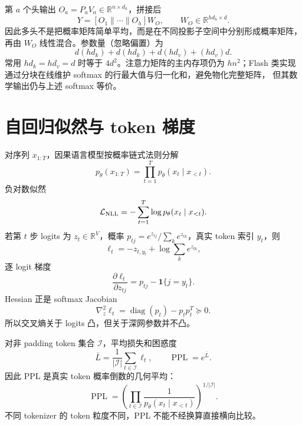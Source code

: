\documentclass[11pt]{article}
\numberwithin{equation}{section}
\newcommand{\R}{\mathbb{R}}
\newcommand{\1}{\mathbf{1}}
\newcommand{\cL}{\mathcal{L}}
\newcommand{\diag}{\operatorname{diag}}
\begin{document}
第 $a$ 个头输出 $O_a=P_aV_a\in\R^{n\times d_h}$，拼接后
\begin{equation}
 Y=[O_1\|\cdots\|O_h]W_O,
 \qquad W_O\in\R^{hd_h\times d}.
\end{equation}
因此多头不是把概率矩阵简单平均，而是在不同投影子空间中分别形成概率矩阵，
再由 $W_O$ 线性混合。参数量（忽略偏置）为
\begin{equation}
 d(hd_k)+d(hd_k)+d(hd_v)+(hd_v)d.
\end{equation}
常用 $hd_k=hd_v=d$ 时等于 $4d^2$。注意力矩阵的主内存项仍为
$h n^2$；Flash 类实现通过分块在线维护 softmax 的行最大值与归一化和，避免物化完整矩阵，
但其数学输出仍与上述 softmax 等价。

\section{自回归似然与 token 梯度}

对序列 $x_{1:T}$，因果语言模型按概率链式法则分解
\begin{equation}
 p_\theta(x_{1:T})=\prod_{t=1}^{T}p_\theta(x_t\mid x_{<t}).
\end{equation}
负对数似然
\begin{equation}
 \cL_{\rm NLL}=-\sum_{t=1}^{T}\log p_\theta(x_t\mid x_{<t}).
\end{equation}
若第 $t$ 步 logits 为 $z_t\in\R^{V}$，概率
$p_{tj}=e^{z_{tj}}/\sum_ke^{z_{tk}}$，真实 token 索引 $y_t$，则
\begin{equation}
 \ell_t=-z_{t,y_t}+\log\sum_ke^{z_{tk}},
\end{equation}
逐 logit 梯度
\begin{equation}
 \frac{\partial\ell_t}{\partial z_{tj}}
 =p_{tj}-\1\{j=y_t\}.
\end{equation}
Hessian 正是 softmax Jacobian
\begin{equation}
 \nabla_z^2\ell_t=\diag(p_t)-p_tp_t^T\succeq0.
\end{equation}
所以交叉熵关于 logits 凸，但关于深网参数并不凸。

对非 padding token 集合 $\mathcal I$，平均损失和困惑度
\begin{equation}
 \bar L=\frac1{|\mathcal I|}\sum_{t\in\mathcal I}\ell_t,
 \qquad \operatorname{PPL}=e^{\bar L}.
\end{equation}
因此 PPL 是真实 token 概率倒数的几何平均：
\begin{equation}
 \operatorname{PPL}=\left(
 \prod_{t\in\mathcal I}\frac1{p_\theta(x_t\mid x_{<t})}
 \right)^{1/|\mathcal I|}.
\end{equation}
不同 tokenizer 的 token 粒度不同，PPL 不能不经换算直接横向比较。
\end{document}
